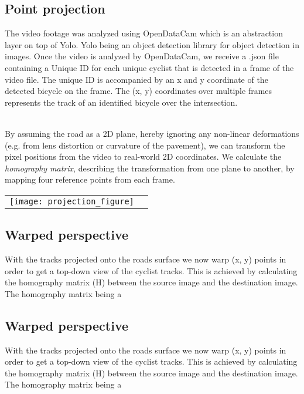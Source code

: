 \documentclass[10pt, a4paper, twocolumn]{article} %
\begin{document}
\subsection{Point projection}
The video footage was analyzed using OpenDataCam which is an abstraction layer on top of Yolo. Yolo being an object detection library for object detection in images.
Once the video is analyzed by OpenDataCam, we receive a .json file containing a Unique ID for each unique cyclist that is detected in a frame of the video file. 
The unique ID is accompanied by an x and y coordinate of the detected bicycle on the frame. The (x, y) coordinates over multiple frames represents the track of an identified bicycle over the intersection.

\ \\
By assuming the road as a 2D plane, hereby ignoring any non-linear deformations (e.g. from lens distortion or curvature of the pavement), 
we can transform the pixel positions from the video to real-world 2D coordinates. 
We calculate the \textit{homography matrix}, describing the transformation from one plane to another, by mapping four reference points from each frame.

\begin{tabular}{cc}
\noindent
	\texttt{[image: projection\_figure]} 
\end{tabular}
\subsection{Warped perspective}
With the tracks projected onto the roads surface we now warp (x, y) points in order to get a top-down view of the cyclist tracks.
This is achieved by calculating the homography matrix (H) between the source image and the destination image. The homography matrix being a 


\subsection{Warped perspective}
With the tracks projected onto the roads surface we now warp (x, y) points in order to get a top-down view of the cyclist tracks.
This is achieved by calculating the homography matrix (H) between the source image and the destination image. The homography matrix being a 
\end{document}
